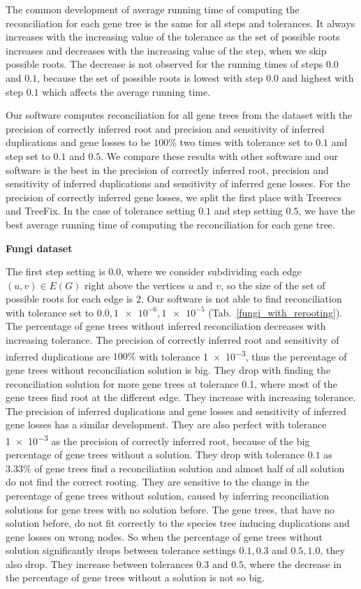 The common development of average running time of computing the reconciliation for each gene tree is the same for all steps and tolerances. It always increases with the increasing value of the tolerance as the set of possible roots increases and decreases with the increasing value of the step, when we skip possible roots. The decrease is not observed for the running times of steps $0.0$ and $0.1$, because the set of possible roots is lowest with step $0.0$ and highest with step $0.1$ which affects the average running time.

Our software computes reconciliation for all gene trees from the dataset with the precision of correctly inferred root and precision and sensitivity of inferred duplications and gene losses to be $100\%$ two times with tolerance set to $0.1$ and step set to $0.1$ and $0.5$. We compare these results with other software and our software is the best in the precision of correctly inferred root, precision and sensitivity of inferred duplications and sensitivity of inferred gene losses. For the precision of correctly inferred gene losses, we split the first place with Treerecs and TreeFix. In the case of tolerance setting $0.1$ and step setting $0.5$, we have the best average running time of computing the reconciliation for each gene tree.

\noindent \textbf{Fungi dataset}

The first step setting is $0.0$, where we consider subdividing each edge $(u,v) \in E(G)$ right above the vertices $u$ and $v$, so the size of the set of possible roots for each edge is 2. Our software is not able to find reconciliation with tolerance set to $0.0, \num{1e-6}, \num{1e-5}$ (Tab.~\ref{fungi_with_rerooting}). The percentage of gene trees without inferred reconciliation decreases with increasing tolerance. The precision of correctly inferred root and sensitivity of inferred duplications are $100\%$ with tolerance \num{1e-3}, thus the percentage of gene trees without reconciliation solution is big. They drop with finding the reconciliation solution for more gene trees at tolerance \num{0.1}, where most of the gene trees find root at the different edge. They increase with increasing tolerance. The precision of inferred duplications and gene losses and sensitivity of inferred gene losses has a similar development. They are also perfect with tolerance \num{1e-3} as the precision of correctly inferred root, because of the big percentage of gene trees without a solution. They drop with tolerance $0.1$ as $3.33\%$ of gene trees find a reconciliation solution and almost half of all solution do not find the correct rooting. They are sensitive to the change in the percentage of gene trees without solution, caused by inferring reconciliation solutions for gene trees with no solution before. The gene trees, that have no solution before, do not fit correctly to the species tree inducing duplications and gene losses on wrong nodes. So when the percentage of gene trees without solution significantly drops between tolerance settings $0.1, 0.3$ and $0.5, 1.0$, they also drop. They increase between tolerances $0.3$ and $0.5$, where the decrease in the percentage of gene trees without a solution is not so big.

